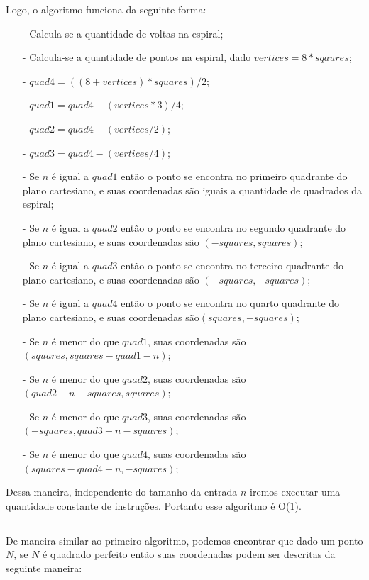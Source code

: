 \documentclass[12pt,a4paper]{article}
\begin{document}
        Logo, o algoritmo funciona da seguinte forma:
        \begin{itemize}
        	\item[-] Calcula-se a quantidade de voltas na espiral;
        	\item[-] Calcula-se a quantidade de pontos na espiral, dado $vertices = 8 * sqaures$;
        	\item[-] $quad4 = ((8 + vertices) * squares) / 2$;
        	\item[-] $quad1 = quad4 - (vertices * 3) / 4$;
        	\item[-] $quad2 = quad4 - (vertices / 2)$;
        	\item[-] $quad3 = quad4 - (vertices / 4)$;
        	\item[-] Se $n$ é igual a $quad1$ então o ponto se encontra no primeiro quadrante do plano cartesiano, e suas coordenadas são iguais a quantidade de quadrados da espiral;
        	\item[-] Se $n$ é igual a $quad2$ então o ponto se encontra no segundo quadrante do plano cartesiano, e suas coordenadas são $(-squares, squares)$;
        	\item[-] Se $n$ é igual a $quad3$ então o ponto se encontra no terceiro quadrante do plano cartesiano, e suas coordenadas são $(-squares, -squares)$;
        	\item[-] Se $n$ é igual a $quad4$ então o ponto se encontra no quarto quadrante do plano cartesiano, e suas coordenadas são$(squares, -squares)$;
        	\item[-] Se $n$ é menor do que $quad1$, suas coordenadas são $(squares, squares - quad1 - n)$;
        	\item[-] Se $n$ é menor do que $quad2$, suas coordenadas são $(quad2 - n - squares, squares)$;
        	\item[-] Se $n$ é menor do que $quad3$, suas coordenadas são $(-squares, quad3 - n - squares)$;
        	\item[-] Se $n$ é menor do que $quad4$, suas coordenadas são $(squares - quad4 - n, -squares)$;
        	
        	
        	
        	
    	\end{itemize}
        Dessa maneira, independente do tamanho da entrada $n$ iremos executar uma quantidade constante de instruções. Portanto esse algoritmo é O(1).
        
    \subsection{}
        De maneira similar ao primeiro algoritmo, podemos encontrar que dado um ponto $N$, se $N$ é quadrado perfeito então suas coordenadas podem ser descritas da seguinte maneira: 
        
\end{document}
